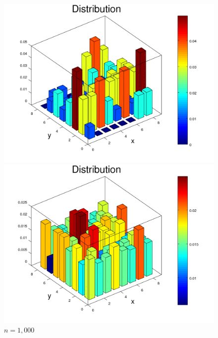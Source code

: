 \documentclass{amsart}
\numberwithin{equation}{section}
\begin{document}
\begin{figure}[!h]
    \centering
   \begin{minipage}{0.50\textwidth}
     \centering
     \includegraphics[width=1.0\linewidth]{figures/regular/figure_Rook_path_n100.png}
     \captionsetup{labelformat=empty}
     \caption*{$n=100$}
   \end{minipage}\hfil
   \begin{minipage}{0.50\textwidth}
     \centering
     \includegraphics[width=1.0\linewidth]{figures/regular/figure_Rook_path_n1000.png}
     \captionsetup*{labelformat=empty}
     \caption{$n=1,000$}
   \end{minipage}\hfil
   \begin{minipage}{0.50\textwidth}

\end{minipage}
\end{figure}
\end{document}
